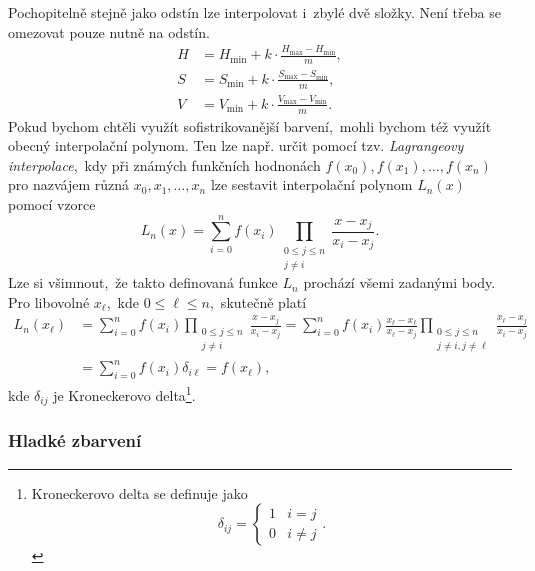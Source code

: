 Pochopitelně stejně jako odstín lze interpolovat i~zbylé dvě složky. Není třeba se omezovat pouze nutně na odstín.
\begin{align*}
    H&=H_{\text{min}}+k\cdot\frac{H_{\text{max}}-H_{\text{min}}}{m},\\
    S&=S_{\text{min}}+k\cdot\frac{S_{\text{max}}-S_{\text{min}}}{m},\\
    V&=V_{\text{min}}+k\cdot\frac{V_{\text{max}}-V_{\text{min}}}{m}.
\end{align*}
Pokud bychom chtěli využít sofistrikovanější barvení,~mohli bychom též využít obecný interpolační polynom. Ten lze např. určit pomocí tzv. \emph{Lagrangeovy interpolace},~kdy při známých funkčních hodnonách $f(x_0),f(x_1),\ldots,f(x_n)$ pro nazvájem různá $x_0,x_1,\ldots,x_n$ lze sestavit interpolační polynom $L_n(x)$ pomocí vzorce
\[L_n(x)=\sum_{i=0}^{n}f(x_i)\prod_{\substack{0\leqslant j\leqslant n\\j\neq i}}{\frac {x-x_{j}}{x_{i}-x_{j}}}.\]
Lze si všimnout,~že takto definovaná funkce $L_n$ prochází všemi zadanými body. Pro libovolné $x_\ell$,~kde $0\leqslant\ell\leqslant n$,~skutečně platí
\begin{align*}
    L_n(x_\ell)&=\sum_{i=0}^{n}f(x_i)\prod_{\substack{0\leqslant j\leqslant n\\j\neq i}}{\frac {x-x_{j}}{x_{i}-x_{j}}}=\sum_{i=0}^{n}f(x_i)\frac{x_\ell-x_\ell}{x_{\ell}-x_{j}}\prod_{\substack{0\leqslant j\leqslant n\\j\neq i,j\neq\ell}}{\frac {x_\ell-x_{j}}{x_{i}-x_{j}}}\\
    &=\sum_{i=0}^{n}f(x_i)\delta_{i\ell}=f(x_\ell),
\end{align*}
kde $\delta_{ij}$ je Kroneckerovo delta\footnote{Kroneckerovo delta se definuje jako
\[\delta_{ij}=\begin{cases}
    1 & i=j\\
    0 & i\neq j
\end{cases}.\]
}.

\subsubsection{Hladké zbarvení}

